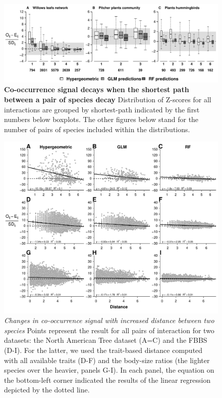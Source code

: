 \begin{figure}
\centering
\includegraphics{chapitre3/figS5.pdf}
\caption{\textbf{Co-occurrence signal decays when the shortest path
between a pair of species decay} Distribution of Z-scores for all
interactions are grouped by shortest-path indicated by the first numbers
below boxplots. The other figures below stand for the number of pairs of
species included within the distributions.\label{fig:sht_pth2}}
\end{figure}

\newpage

\begin{figure}
\centering
\includegraphics{chapitre3/figS6.pdf}
\caption{\emph{Changes in co-occurrence signal with increased distance
between two species} Points represent the result for all pairs of
interaction for two datasets: the North American Tree dataset (A=C) and
the FBBS (D-I). For the latter, we used the trait-based distance
computed with all available traits (D-F) and the body-size ratios (the
lighter species over the heavier, panels G-I). In each panel, the
equation on the bottom-left corner indicated the results of the linear
regression depicted by the dotted line.\label{fig:distrev}}
\end{figure}

